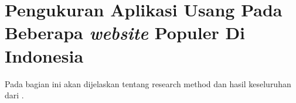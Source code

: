 


\section{Pengukuran Aplikasi Usang Pada Beberapa \textit{website} Populer Di Indonesia\cite{pascal}}
Pada bagian ini akan dijelaskan tentang research method dan hasil keseluruhan dari \cite{pascal}.

